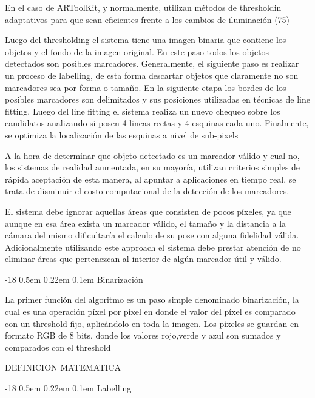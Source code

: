 \documentclass[runningheads]{llncs}
\makeatletter
\renewcommand\subsubsection{\@startsection{subsubsection}{3}{\z@}%
	{-18\p@ \@plus -4\p@ \@minus -4\p@}%
	{0.5em \@plus 0.22em \@minus 0.1em}%
	{\normalfont\normalsize\bfseries\boldmath}}
\makeatother
\begin{document}
En el caso de ARToolKit, y normalmente, utilizan métodos de thresholdin adaptativos para que sean eficientes frente a los cambios de iluminación (75)

Luego del thresholding el sistema tiene una imagen binaria que contiene los objetos y el fondo de la imagen original. En este paso todos los objetos detectados son posibles marcadores. Generalmente, el siguiente paso es realizar un proceso de labelling, de esta forma descartar objetos que claramente no son marcadores sea por forma o tamaño.
En la siguiente etapa los bordes de los posibles marcadores son delimitados y sus posiciones utilizadas en técnicas de line fitting. Luego del line fitting el sistema realiza un nuevo chequeo sobre los candidatos analizando si posen 4 lineas rectas y 4 esquinas cada uno. Finalmente, se optimiza la localización de las esquinas a nivel de sub-pixels

A la hora de determinar que objeto detectado es un marcador válido y cual no, los sistemas de realidad aumentada, en su mayoría, utilizan criterios simples de rápida aceptación de esta manera, al apuntar a aplicaciones en tiempo real, se trata de disminuir el costo computacional de la detección de los marcadores.

El sistema debe ignorar aquellas áreas que consisten de pocos píxeles, ya que aunque en esa área exista un marcador válido, el tamaño y la distancia a la cámara del mismo dificultaría el calculo de su pose con alguna fidelidad válida. Adicionalmente utilizando este approach el sistema debe prestar atención de no eliminar áreas que pertenezcan al interior de algún marcador útil y válido.

\subsubsection{Binarización}

La primer función del algoritmo es un paso simple denominado binarización, la cual es una 
operación píxel por píxel en donde el valor del píxel es comparado con un threshold fijo, 
aplicándolo en toda la imagen. Los píxeles se guardan en formato RGB de 8 bits, donde los 
valores rojo,verde y azul son sumados y comparados con el threshold

DEFINICION MATEMATICA

\subsubsection{Labelling}
\end{document}

